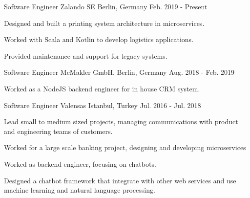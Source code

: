 


\begin{cventries}

  \cventry
    {Software Engineer}
    {Zalando SE}
    {Berlin, Germany}
    {Feb. 2019 - Present}
    {
      \begin{cvitems}
        \item {Designed and built a printing system architecture in microservices.}
        \item {Worked with Scala and Kotlin to develop logistics applications.}
        \item {Provided maintenance and support for legacy systems.}
      \end{cvitems}
    }


  \cventry
    {Software Engineer}
    {McMakler GmbH.}
    {Berlin, Germany}
    {Aug. 2018 - Feb. 2019}
    {
      \begin{cvitems}
        \item {Worked as a NodeJS backend engineer for in house CRM system.}
      \end{cvitems}
    }

  \cventry
    {Software Engineer}
    {Valensas}
    {Istanbul, Turkey}
    {Jul. 2016 - Jul. 2018}
    {
      \begin{cvitems}
        \item {Lead small to medium sized projects, managing communications with product and engineering teams of customers.}
        \item {Worked for a large scale banking project, designing and developing microservices}
        \item {Worked as backend engineer, focusing on chatbots.}
        \item {Designed a chatbot framework that integrate with other web services and use machine learning and natural language processing.}
      \end{cvitems}
    }


\end{cventries}
